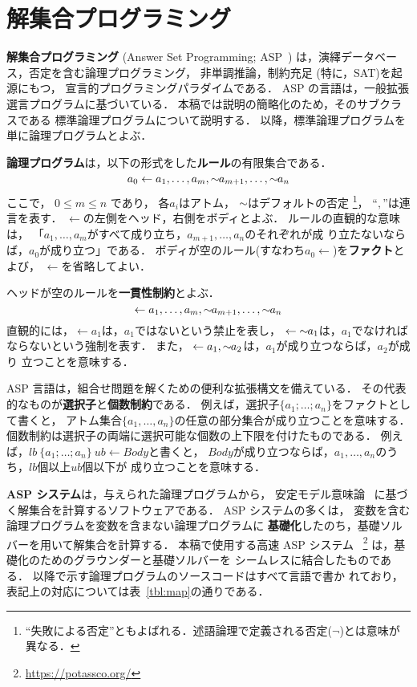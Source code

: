 ﻿\section{解集合プログラミング} \label{chap:asp}

\textbf{解集合プログラミング} (Answer Set Programming; ASP~\cite{%
  Baral03:cambridge,%
  Gelfond88:iclp,%
  Inoue08:jssst,%
  Niemela99:amai})
は，演繹データベース，否定を含む論理プログラミング，
非単調推論，制約充足 (特に，SAT)を起源にもつ，
宣言的プログラミングパラダイムである．
ASP の言語は，一般拡張選言プログラムに基づいている．
本稿では説明の簡略化のため，そのサブクラスである
標準論理プログラムについて説明する．
以降，標準論理プログラムを単に論理プログラムとよぶ．

\textbf{論理プログラム}は，以下の形式をした\textbf{ルール}の有限集合である．
\[
  a_0\leftarrow a_1,\dots,a_m,{\sim\!\!{a_{m+1}}},\dots,{\sim\!\!{a_n}}
\]
ここで，
$0\leq m\leq n$ であり，
各$a_i$はアトム，
${\sim\!\!{}}$はデフォルトの否定
\footnote{``失敗による否定''ともよばれる．述語論理で定義される否定($\neg$)とは意味が異なる．}，
``$,$''は連言を表す．
$\leftarrow$の左側をヘッド，右側をボディとよぶ．
ルールの直観的な意味は，
「$a_1,\ldots,a_m$がすべて成り立ち，$a_{m+1},\ldots,a_n$のそれぞれが成
り立たないならば，$a_0$が成り立つ」である．
ボディが空のルール(すなわち\(a_0\leftarrow\))を\textbf{ファクト}とよび，
$\leftarrow$を省略してよい．

ヘッドが空のルールを\textbf{一貫性制約}とよぶ．
\[
  \leftarrow a_1,\dots,a_m,{\sim\!\!{a_{m+1}}},\dots,{\sim\!\!{a_n}}
\]
直観的には，\(\leftarrow a_1\)は，$a_1$ではないという禁止を表し，
\(\leftarrow {\sim\!\!{a_1}}\)は，$a_1$でなければならないという強制を表す．
また，
\(\leftarrow a_1, {\sim\!\!{a_{2}}}\)は，$a_1$が成り立つならば，$a_2$が成り
立つことを意味する．

ASP 言語は，組合せ問題を解くための便利な拡張構文を備えている．
その代表的なものが\textbf{選択子}と\textbf{個数制約}である．
例えば，選択子\(\{a_1;\dots;a_n\}\)をファクトとして書くと，
アトム集合\(\{a_1,\dots,a_n\}\)の任意の部分集合が成り立つことを意味する．
個数制約は選択子の両端に選択可能な個数の上下限を付けたものである．
例えば，\(lb\ \{a_1;\dots;a_n\}\ ub \leftarrow Body\)と書くと，
$Body$が成り立つならば，$a_1,\dots,a_n$のうち，$lb$個以上$ub$個以下が
成り立つことを意味する．

\textbf{ASP システム}は，与えられた論理プログラムから，
安定モデル意味論~\cite{Gelfond88:iclp}
に基づく解集合を計算するソフトウェアである．
ASP システムの多くは，
変数を含む論理プログラムを変数を含まない論理プログラムに
\textbf{基礎化}したのち，基礎ソルバーを用いて解集合を計算する．
本稿で使用する高速 ASP システム
{\clingo}~\footnote{\url{https://potassco.org/}}
は，基礎化のためのグラウンダー{\gringo}と基礎ソルバー{\clasp}を
シームレスに結合したものである．
以降で示す論理プログラムのソースコードはすべて{\clingo}言語で書か
れており，表記上の対応については表~\ref{tbl:map}の通りである．

